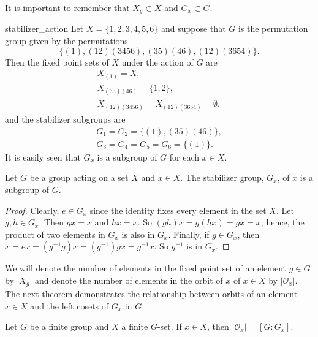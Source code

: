  
\medskip
 
 
It is important to remember that $X_g \subset X$ and $G_x \subset G$. 
 
 
\begin{example}{stabilizer_action}
Let $X = \{1, 2, 3, 4, 5, 6\}$ and suppose that $G$ is the permutation
group given by the permutations 
\[
\{
(1), (1 2)(3 4 5 6), (3 5)(4 6), (1 2)( 3 6 5 4)
\}.
\]
Then the fixed point sets  of $X$ under the action of $G$ are
\begin{gather*}
X_{(1)}  =  X, \\
X_{(3 5)(4 6)}  =  \{1,2\}, \\
X_{(1 2)(3 4 5 6)}  = X_{(1 2)(3 6 5 4)}  =  \emptyset,
\end{gather*}
and the stabilizer subgroups are
\begin{gather*}
G_1 =  G_2  =  \{(1), (3 5)(4 6) \}, \\
G_3  = G_4  = G_5  = G_6 =  \{(1)\}.
\end{gather*}
It is easily  seen that  $G_x$ is a subgroup of $G$ for each $x \in
X$. 
\end{example}
 
 
\begin{proposition}
Let $G$ be a  group acting on a set $X$ and $x \in X$. The stabilizer
group, $G_x$, of $x$ is a subgroup of $G$. 
\end{proposition}
 
 
\begin{proof}
Clearly,  $e \in G_x$ since the identity fixes every element in the
set $X$. Let $g, h \in G_x$. Then $gx = x$ and $hx = x$. So $(gh)x =
g(hx) = gx = x$; hence, the product of two elements in $G_x$ is also
in $G_x$. Finally, if $g \in G_x$, then $x = ex = (g^{-1}g)x =
(g^{-1})gx = g^{-1} x$. So $g^{-1}$ is in $G_x$. 
\end{proof}
 
 
\medskip
 
 
We will denote the number of elements in the fixed point set of an
element $g \in G$ by $|X_g|$ and denote the number of elements in the
orbit of $x$ of $x \in X$ by $|{\mathcal O}_x|$. The next theorem
demonstrates the relationship between orbits of an element $x \in X$
and the left cosets of $G_x$ in $G$.
 
 
\begin{theorem}\label{orbit_theorem}
Let $G$ be a finite group and $X$ a finite $G$-set. If $x \in X$,
then $|{\mathcal O}_x| = [G:G_x]$. 
\end{theorem}
 
